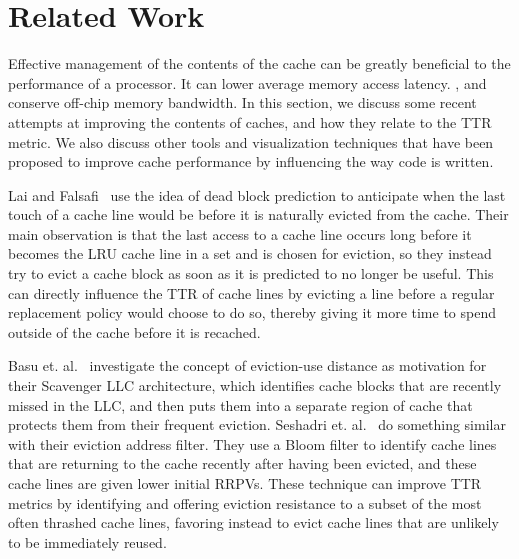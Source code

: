 \section{Related Work}

Effective management of the contents of the cache can
be greatly beneficial to the performance of a processor.  It can 
lower average memory access latency.
, and conserve off-chip memory 
bandwidth.  In this section, we discuss some recent attempts at improving
the contents of caches, and how they relate to the TTR 
metric.  We also discuss other tools
and visualization techniques that have been proposed to improve cache
performance by influencing the way code is written.


Lai and Falsafi~\cite{Lai00} use the idea of dead block prediction to 
anticipate when the last touch of a cache line would be before it is naturally
evicted from the cache.  Their main observation is that the last access to a cache
line occurs long before it becomes the LRU cache line in a set and is chosen
for eviction, so they instead try to evict a cache block as soon as it is predicted
to no longer be useful.  This can directly influence the TTR of cache lines by evicting a line before a 
regular replacement policy would choose to do so, thereby giving it more time to spend outside of the cache 
before it is recached.

Basu et. al.~\cite{basukirman07} investigate the concept of eviction-use distance
as motivation for their Scavenger LLC architecture, which identifies
cache blocks that are recently missed in the LLC, and then puts them
into a separate region of cache that protects them from their frequent
eviction.  
Seshadri et. al.~\cite{seshadri12} do something similar with their eviction address
filter.  They use a Bloom filter to identify cache lines that are returning to the
cache recently after having been evicted, and these cache lines are given lower
initial RRPVs.
These technique can improve TTR metrics by identifying and 
offering eviction resistance to a subset of the most
often thrashed cache lines, favoring instead to evict cache lines that are
unlikely to be immediately reused.

